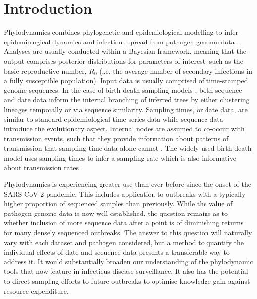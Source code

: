 \documentclass{article}
\newcommand{\ignore}[1]{}
\begin{document}
\section*{Introduction}
Phylodynamics combines phylogenetic and epidemiological modelling to infer epidemiological dynamics and infectious spread from pathogen genome data \citep{du2015getting,baele2018recent,volz2013viral,Grenfell2004}. Analyses are usually conducted within a Bayesian framework, meaning that the output comprises posterior distributions for parameters of interest, such as the basic reproductive number, $R_{0}$ (i.e. the average number of secondary infections in a fully susceptible population). Input data is usually comprised of time-stamped genome sequences. In the case of birth-death-sampling models \citep{stadler_sampling-through-time_2010,stadler2013}, both sequence and date data inform the internal branching of inferred trees by either clustering lineages temporally or via sequence similarity.  Sampling times, or date data, are similar to standard epidemiological time series data while sequence data introduce the evolutionary aspect. Internal nodes are assumed to co-occur with transmission events, such that they provide information about patterns of transmission that sampling time data alone cannot \ignore{cite review when out}. The widely used birth-death model uses sampling times to infer a sampling rate which is also informative about transmission rates \citep{boskova2018influence,stadler2012estimating}. 

Phylodynamics is experiencing greater use than ever before since the onset of the SARS-CoV-2 pandemic. This includes application to outbreaks with a typically higher proportion of sequenced samples than previously. While the value of pathogen genome data is now well established, the question remains as to whether inclusion of more sequence data after a point is of diminishing returns for many densely sequenced outbreaks. The answer to this question will  naturally vary with each dataset and pathogen considered, but a method to quantify the individual effects of date and sequence data presents a transferable way to address it. It would substantially broaden our understanding of the phylodynamic tools that now feature in infectious disease surveillance. It also has the potential to direct sampling efforts to future outbreaks to optimise knowledge gain against resource expenditure. 
\end{document}
